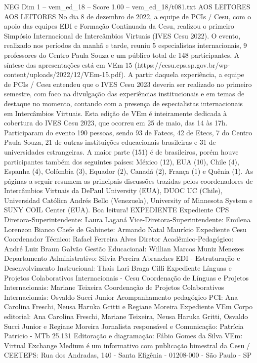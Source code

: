 \begin{textsample}{NEG Dim 1 – vem\_ed\_18 – Score 1.00 – vem\_ed\_18/t081.txt}  \label{ex:f1_neg_062}
AOS LEITORES AOS LEITORES No dia 8 de dezembro de 2022, a equipe de PCIs / Cesu, com o apoio das equipes EDI e Formação Continuada da Cesu, realizou o primeiro Simpósio Internacional de Intercâmbios Virtuais (IVES Cesu 2022).
O evento, realizado nos períodos da manhã e tarde, reuniu 5 especialistas internacionais, 9 professores do Centro Paula Souza e um público total de 148 participantes.
A síntese das apresentações está em VEm 15 (https://cesu.cps.sp.gov.br/wp-content/uploads/2022/12/VEm-15.pdf).
A partir daquela experiência, a equipe de PCIs / Cesu entendeu que o IVES Cesu 2023 deveria ser realizado no primeiro semestre, com foco na divulgação das experiências institucionais e em temas de destaque no momento, contando com a presença de especialistas internacionais em Intercâmbios Virtuais.
Esta edição de VEm é inteiramente dedicada à cobertura do IVES Cesu 2023, que ocorreu em 25 de maio, das 14 às 17h.
Participaram do evento 190 pessoas, sendo 93 de Fatecs, 42 de Etecs, 7 do Centro Paula Souza, 21 de outras instituições educacionais brasileiras e 31 de universidades estrangeiras.
A maior parte (151) é de brasileiros, porém houve participantes também dos seguintes países: México (12), EUA (10), Chile (4), Espanha (4), Colômbia (3), Equador (2), Canadá (2), França (1) e Quênia (1).
As páginas a seguir resumem as principais discussões trazidas pelos coordenadores de Intercâmbios Virtuais da DePaul University (EUA), DUOC UC (Chile), Universidad Católica Andrés Bello (Venezuela), University of Minnesota System e SUNY COIL Center (EUA).
Boa leitura!
EXPEDIENTE Expediente CPS Diretora-Superintendente: Laura Laganá Vice-Diretora-Superintendente: Emilena Lorenzon Bianco Chefe de Gabinete: Armando Natal Maurício Expediente Cesu Coordenador Técnico: Rafael Ferreira Alves Diretor Acadêmico-Pedagógico: André Luiz Braun Galvão Gestão Educacional: Willian Marcos Muniz Menezes Departamento Administrativo: Silvia Pereira Abranches EDI - Estruturação e Desenvolvimento Instrucional: Thais Lari Braga Cilli Expediente Línguas e Projetos Colaborativos Internacionais - Cesu Coordenação de Línguas e Projetos Internacionais: Mariane Teixeira Coordenação de Projetos Colaborativos Internacionais: Osvaldo Succi Junior Acompanhamento pedagógico PCI: Ana Carolina Freschi, Neusa Haruka Gritti e Regiane Moreira Expediente VEm Corpo editorial: Ana Carolina Freschi, Mariane Teixeira, Neusa Haruka Gritti, Osvaldo Succi Junior e Regiane Moreira Jornalista responsável e Comunicação: Patrícia Patricio - MTb 25.131 Editoração e diagramação: Fábio Gomes da Silva VEm: Virtual Exchange Medium é um informativo com publicação bimestral da Cesu / CEETEPS: Rua dos Andradas, 140 - Santa Efigênia - 01208-000 - São Paulo - SP

\end{textsample}
